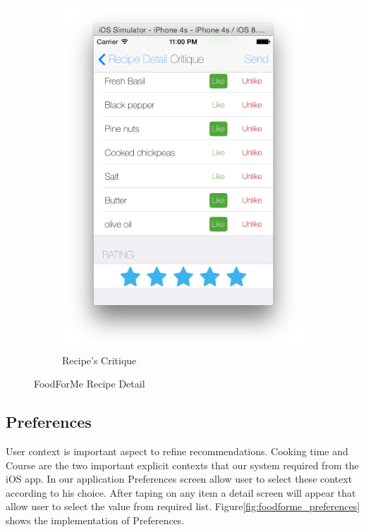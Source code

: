 \begin{figure}[h]
\begin{subfigure}{.32\textwidth}
	  		\includegraphics[width=.9\linewidth]{figures/ch4_app_screen_shots/critique/critique_4.png}
	  		\caption{Recipe's Critique}
	  		\end{subfigure}
	  	\caption{FoodForMe Recipe Detail}
	  	\label{fig:foodforme_recpie_critiquing}
	  \end{figure}
\newpage
\subsection{Preferences} 

User context is important aspect to refine recommendations. Cooking time and Course are the two important explicit contexts that our system required from the iOS app.  In our application Preferences screen allow user to select these context according to his choice. After taping on any item a detail screen will appear that allow user to select the value from required list. Figure\ref{fig:foodforme_preferences} shows the implementation of Preferences. 

